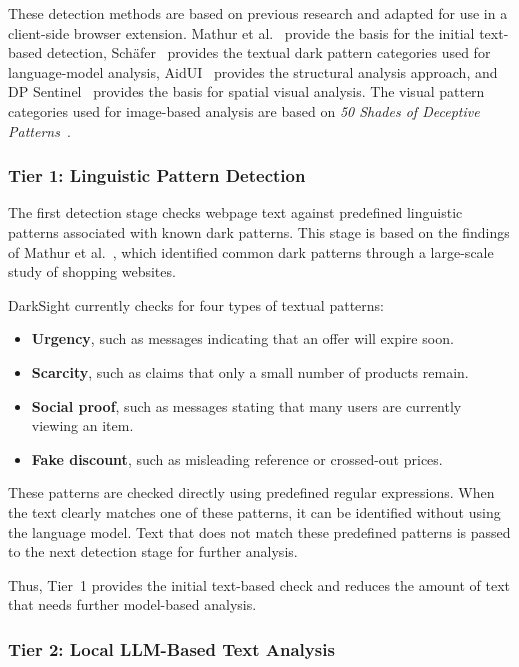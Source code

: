\documentclass[11pt,a4paper]{article}
\begin{document}
These detection methods are based on previous research and adapted for use in a client-side browser extension. Mathur et al.~\cite{mathur2019} provide the basis for the initial text-based detection, Sch\"afer~\cite{schaefer2023} provides the textual dark pattern categories used for language-model analysis, AidUI~\cite{aidui2023} provides the structural analysis approach, and DP Sentinel~\cite{dpsentinel2024} provides the basis for spatial visual analysis. The visual pattern categories used for image-based analysis are based on \textit{50 Shades of Deceptive Patterns}~\cite{gray2023}.

\subsubsection{Tier 1: Linguistic Pattern Detection}
\label{subsubsec:tier1}

The first detection stage checks webpage text against predefined linguistic patterns associated with known dark patterns. This stage is based on the findings of Mathur et al.~\cite{mathur2019}, which identified common dark patterns through a large-scale study of shopping websites.

DarkSight currently checks for four types of textual patterns:
\begin{itemize}[leftmargin=1.5em]
    \item \textbf{Urgency}, such as messages indicating that an offer will expire soon.
    \item \textbf{Scarcity}, such as claims that only a small number of products remain.
    \item \textbf{Social proof}, such as messages stating that many users are currently viewing an item.
    \item \textbf{Fake discount}, such as misleading reference or crossed-out prices.
\end{itemize}

These patterns are checked directly using predefined regular expressions. When the text clearly matches one of these patterns, it can be identified without using the language model. Text that does not match these predefined patterns is passed to the next detection stage for further analysis.

Thus, Tier~1 provides the initial text-based check and reduces the amount of text that needs further model-based analysis.

\subsubsection{Tier 2: Local LLM-Based Text Analysis}
\label{subsubsec:tier2}
\end{document}
